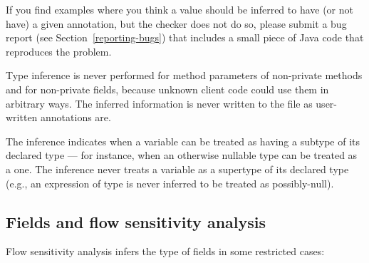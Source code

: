 If you find examples where you think a value should be inferred to have
(or not have) a
given annotation, but the checker does not do so, please submit a bug
report (see Section~\ref{reporting-bugs}) that includes a small piece of
Java code that reproduces the problem.

%
%



Type inference is never performed for method parameters of non-private
methods and for non-private fields, because unknown client code could use
them in arbitrary ways.  The inferred information is never written to the
 file as user-written annotations are.

The inference indicates when a variable can be treated as having a subtype
of its declared type --- for instance, when an otherwise nullable type can be
treated as a  one.  The inference never treats a variable as
a supertype of its declared type (e.g., an expression of 
type is never inferred to be treated as possibly-null).

\subsection{Fields and flow sensitivity analysis}

Flow sensitivity analysis infers the type of fields in some restricted cases:

